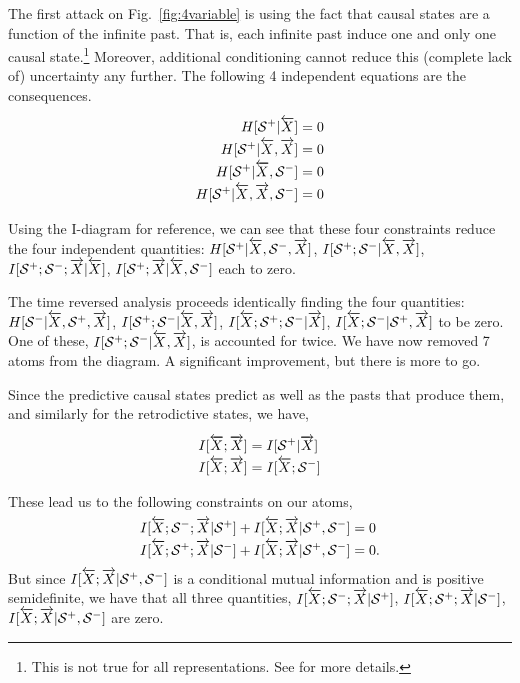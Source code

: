 The first attack on Fig.~\ref{fig:4variable} is using the fact that causal states are a function of the infinite past. That is, each infinite past induce one and only one causal state.\footnote{This is not true for all representations. See  for more details.} Moreover, additional conditioning cannot reduce this (complete lack of) uncertainty any further. The following 4 independent equations are the consequences.

\begin{align*}
H[{\mathcal{S}}^{+} | \smash{\overleftarrow {{X}}}] &= 0\\
H[{\mathcal{S}}^{+} | \smash{\overleftarrow {{X}}}, \smash{\overrightarrow{{X}}}] &= 0\\
H[{\mathcal{S}}^{+} | \smash{\overleftarrow {{X}}}, {\mathcal{S}}^{-}] &= 0\\
H[{\mathcal{S}}^{+} | \smash{\overleftarrow {{X}}}, \smash{\overrightarrow{{X}}}, {\mathcal{S}}^{-}] &= 0
\end{align*}

Using the I-diagram for reference, we can see that these four constraints reduce the four independent quantities: $H[{\mathcal{S}}^{+} | \smash{\overleftarrow {{X}}}, {\mathcal{S}}^{-}, \smash{\overrightarrow{{X}}}]$, $I[{\mathcal{S}}^{+} ; {\mathcal{S}}^{-} | \smash{\overleftarrow {{X}}}, \smash{\overrightarrow{{X}}}]$, $I[{\mathcal{S}}^{+} ; {\mathcal{S}}^{-} ; \smash{\overrightarrow{{X}}} | \smash{\overleftarrow {{X}}}]$, $I[{\mathcal{S}}^{+} ; \smash{\overrightarrow{{X}}} | \smash{\overleftarrow {{X}}}, {\mathcal{S}}^{-}]$ each to zero.

The time reversed analysis proceeds identically finding the four quantities: $H[{\mathcal{S}}^{-} | \smash{\overleftarrow {{X}}}, {\mathcal{S}}^{+}, \smash{\overrightarrow{{X}}}]$, $I[{\mathcal{S}}^{+} ; {\mathcal{S}}^{-} | \smash{\overleftarrow {{X}}}, \smash{\overrightarrow{{X}}}]$, $I[\smash{\overleftarrow {{X}}} ; {\mathcal{S}}^{+} ; {\mathcal{S}}^{-} | \smash{\overrightarrow{{X}}}]$, $I[\smash{\overleftarrow {{X}}} ; {\mathcal{S}}^{-} | {\mathcal{S}}^{+}, \smash{\overrightarrow{{X}}}]$ to be zero. One of these, $I[{\mathcal{S}}^{+} ; {\mathcal{S}}^{-} | \smash{\overleftarrow {{X}}}, \smash{\overrightarrow{{X}}}]$, is accounted for twice. We have now removed 7 atoms from the diagram. A significant improvement, but there is more to go.

Since the predictive causal states predict as well as the pasts that produce them, and similarly for the retrodictive states, we have,

\begin{align*}
I[\smash{\overleftarrow {{X}}} ; \smash{\overrightarrow{{X}}}] &= I[{\mathcal{S}}^{+} | \smash{\overrightarrow{{X}}}]\\
I[\smash{\overleftarrow {{X}}} ; \smash{\overrightarrow{{X}}}]  &= I[\smash{\overleftarrow {{X}}} ; {\mathcal{S}}^{-}]
\end{align*}

These lead us to the following constraints on our atoms,
\begin{align*}
I[\smash{\overleftarrow {{X}}} ; {\mathcal{S}}^{-} ; \smash{\overrightarrow{{X}}} | {\mathcal{S}}^{+} ] + I[\smash{\overleftarrow {{X}}} ; \smash{\overrightarrow{{X}}} | {\mathcal{S}}^{+}, {\mathcal{S}}^{-}] &= 0\\
I[\smash{\overleftarrow {{X}}} ; {\mathcal{S}}^{+} ; \smash{\overrightarrow{{X}}} | {\mathcal{S}}^{-}] + I[\smash{\overleftarrow {{X}}} ; \smash{\overrightarrow{{X}}} | {\mathcal{S}}^{+}, {\mathcal{S}}^{-}] &= 0.
\end{align*}
But since $I[\smash{\overleftarrow {{X}}} ; \smash{\overrightarrow{{X}}} | {\mathcal{S}}^{+}, {\mathcal{S}}^{-}]$ is a conditional mutual information and is positive semidefinite, we have that all three quantities, $I[\smash{\overleftarrow {{X}}} ; {\mathcal{S}}^{-} ; \smash{\overrightarrow{{X}}} | {\mathcal{S}}^{+}]$, $I[\smash{\overleftarrow {{X}}} ; {\mathcal{S}}^{+} ; \smash{\overrightarrow{{X}}} | {\mathcal{S}}^{-}]$, $I[\smash{\overleftarrow {{X}}} ; \smash{\overrightarrow{{X}}} | {\mathcal{S}}^{+}, {\mathcal{S}}^{-}]$ are zero.

